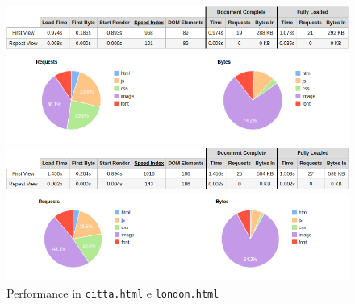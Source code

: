 \begin{figure}[h]
\begin{minipage}{0.45\textwidth}
\includegraphics[width=\linewidth]{images/performance/webpagetest/citta.png}
\end{minipage}
\hspace{\fill}
\vspace*{0.5cm}
\begin{minipage}{0.45\textwidth}

\includegraphics[width=\linewidth]{images/performance/webpagetest/citta-graph.png}
\end{minipage}

\begin{minipage}{0.45\textwidth}
\vspace*{0.5cm}
\includegraphics[width=\linewidth]{images/performance/webpagetest/london.png}
\end{minipage}
\hspace{\fill}
\vspace*{0.5cm}
\begin{minipage}{0.45\textwidth}

\includegraphics[width=\linewidth]{images/performance/webpagetest/london-graph.png}
\end{minipage}
\caption{Performance in \texttt{citta.html} e \texttt{london.html}}\label{multiavp}
\end{figure}

